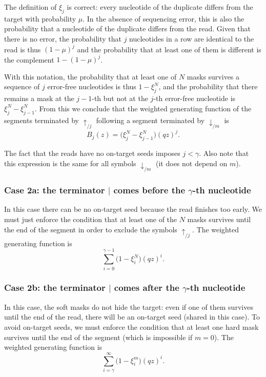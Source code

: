 \documentclass{article}
\begin{document}
The definition of $\xi_j$ is correct: every nucleotide of the duplicate
differs from the target with probability $\mu$. In the absence of
sequencing error, this is also the probability that a nucleotide of the
duplicate differs from the read. Given that there is no error, the
probability that $j$ nucleotides in a row are identical to the read is
thus $(1-\mu)^j$ and the probability that at least one of them is
different is the complement $1-(1-\mu)^j$.

With this notation, the probability that at least one of $N$ masks
survives a sequence of $j$ error-free nucleotides is thus $1-\xi_j^N$, and
the probability that there remains a mask at the $j-1$-th but not at the
$j$-th error-free nucleotide is $\xi_j^N - \xi_{j-1}^N$. From this we
conclude that the weighted generating function of the segments terminated
by $\uparrow_{/j}$ following a segment terminated by $\downarrow_{/m}$ is
\begin{equation}
\label{eq:B}
B_j(z) = \Big( \xi_j^N-\xi_{j-1}^N \Big) (qz)^j.
\end{equation}

The fact that the reads have no on-target seeds imposes $j < \gamma$. Also
note that this expression is the same for all symbols $\downarrow_{/m}$
(it does not depend on $m$).

\subsubsection*{Case 2a: the terminator $|$ comes before the $\gamma$-th
nucleotide}

In this case there can be no on-target seed because the read finishes
too early. We must just enforce the condition that at least one of the $N$
masks survives until the end of the segment in order to exclude the
symbols $\uparrow_{/j}$. The weighted generating function is
\begin{equation*}
\sum_{i=0}^{\gamma-1} \Big(1 - \xi_i^N \Big) (qz)^i.
\end{equation*}

\subsubsection*{Case 2b: the terminator $|$ comes after the $\gamma$-th
nucleotide}

In this case, the soft masks do not hide the target: even if one of them
survives until the end of the read, there will be an on-target seed
(shared in this case). To avoid on-target seeds, we must enforce the
condition that at least one hard mask survives until the end of the
segment (which is impossible if $m = 0$). The weighted generating function
is
\begin{equation*}
\sum_{i=\gamma}^\infty \Big(1 - \xi_i^m \Big) (qz)^i.
\end{equation*}
\end{document}
